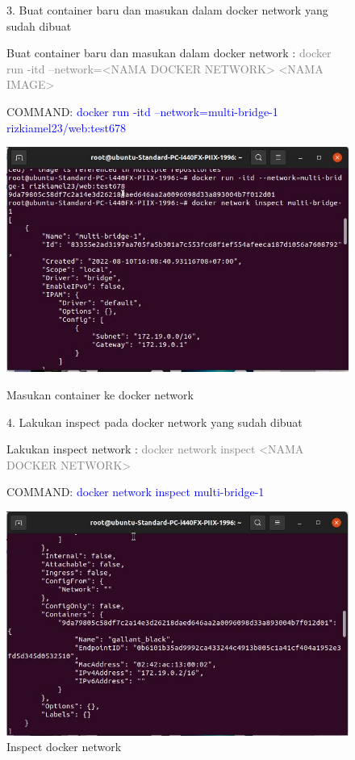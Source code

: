 \begin{figure}
    3. Buat container baru dan masukan dalam docker network yang sudah dibuat

    Buat container baru dan masukan dalam docker network : \textcolor{Gray}{docker run -itd --network=<NAMA DOCKER NETWORK> <NAMA IMAGE>}
    
    COMMAND: \textcolor{Blue}{docker run -itd --network=multi-bridge-1 rizkiamel23/web:test678}
        \begin{center}
            \includegraphics[width=\linewidth]{image/55.jpg}
            \caption{Masukan container ke docker network}
            \label{fig:my_figure}
        \end{center}

    4. Lakukan inspect pada docker network yang sudah dibuat

    Lakukan inspect network : \textcolor{Gray}{docker network inspect <NAMA DOCKER NETWORK>}

    COMMAND: \textcolor{Blue}{docker network inspect multi-bridge-1}
        \begin{center}
            \includegraphics[width=\linewidth]{image/56.jpg}
            \caption{Inspect docker network}
            \label{fig:my_figure}
        \end{center}

\end{figure}

